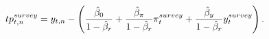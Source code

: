 \begin{equation} \label{eq:TPsurvey}
	tp^{survey}_{t,n} = y_{t,n} - \left( \frac{\hat{\beta}_{0}}{1-\hat{\beta}_{r}} + \frac{\hat{\beta}_{{\pi}}}{1-\hat{\beta}_{r}} \pi^{survey}_{t} + \frac{\hat{\beta}_{{y}}}{1-\hat{\beta}_{r}} y^{survey}_{t} \right).
\end{equation}